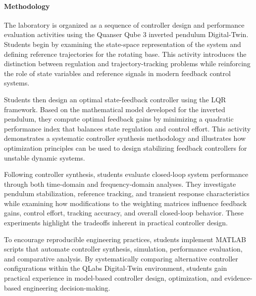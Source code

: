 \documentclass[journal]{IEEEtran}
\begin{document}


\paragraph{Methodology}
The laboratory is organized as a sequence of controller design and performance evaluation activities using the Quanser Qube 3 inverted pendulum Digital-Twin. Students begin by examining the state-space representation of the system and defining reference trajectories for the rotating base. This activity introduces the distinction between regulation and trajectory-tracking problems while reinforcing the role of state variables and reference signals in modern feedback control systems.

Students then design an optimal state-feedback controller using the LQR framework. Based on the mathematical model developed for the inverted pendulum, they compute optimal feedback gains by minimizing a quadratic performance index that balances state regulation and control effort. This activity demonstrates a systematic controller synthesis methodology and illustrates how optimization principles can be used to design stabilizing feedback controllers for unstable dynamic systems.

Following controller synthesis, students evaluate closed-loop system performance through both time-domain and frequency-domain analyses. They investigate pendulum stabilization, reference tracking, and transient response characteristics while examining how modifications to the weighting matrices influence feedback gains, control effort, tracking accuracy, and overall closed-loop behavior. These experiments highlight the tradeoffs inherent in practical controller design.

To encourage reproducible engineering practices, students implement MATLAB scripts that automate controller synthesis, simulation, performance evaluation, and comparative analysis. By systematically comparing alternative controller configurations within the QLabs Digital-Twin environment, students gain practical experience in model-based controller design, optimization, and evidence-based engineering decision-making.
\end{document}
